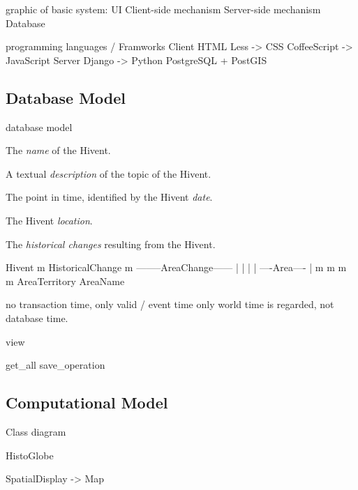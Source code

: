 graphic of basic system:
UI
Client-side mechanism
Server-side mechanism
Database

programming languages / Framworks
Client                    HTML
          Less ->         CSS
          CoffeeScript -> JavaScript
Server    Django ->       Python
                          PostgreSQL
                          + PostGIS


\subsection{Database Model} %
\label{sub:database_model}

database model

\begin{compactenum}
  \item The \emph{name} of the Hivent.
  \item A textual \emph{description} of the topic of the Hivent.
  \item The point in time, identified by the Hivent \emph{date}.
  \item The Hivent \emph{location}.
  \item The \emph{historical changes} resulting from the Hivent.
\end{compactenum}


           Hivent
             m
       HistoricalChange
             m
  --------AreaChange------
  |          |           |
  |     ----Area----     |
  m     m          m     m
AreaTerritory      AreaName

no transaction time, only valid / event time
only world time is regarded, not database time.

view

get\_all
save\_operation



\subsection{Computational Model} %
\label{sub:computational_model}

Class diagram

HistoGlobe

SpatialDisplay -> Map

